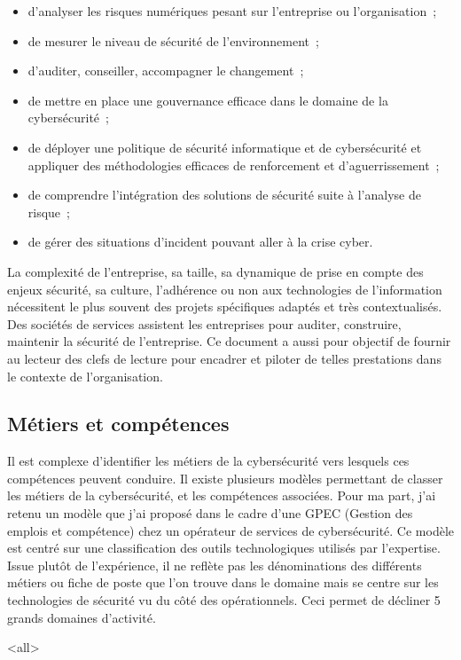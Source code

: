 \begin{itemize}
	\item d'analyser les risques numériques pesant sur l'entreprise ou l'organisation ;
	\item de mesurer le niveau de sécurité de l'environnement ;
	\item d'auditer, conseiller, accompagner le changement ;
	\item de mettre en place une gouvernance efficace dans le domaine de la cybersécurité ;
	\item de déployer une politique de sécurité informatique et de cybersécurité et appliquer des méthodologies efficaces de renforcement et d'aguerrissement ;
	\item de comprendre l'intégration des solutions de sécurité suite à l'analyse de risque ;
	\item de gérer des situations d'incident pouvant aller à la crise cyber.
\end{itemize}
La complexité de l'entreprise, sa taille, sa dynamique de prise en compte des enjeux sécurité, sa culture, l'adhérence ou non aux technologies de l'information nécessitent le plus souvent des projets spécifiques adaptés et très contextualisés. Des sociétés de services assistent les entreprises pour auditer, construire, maintenir la sécurité de l'entreprise. Ce document a aussi pour objectif de fournir au lecteur des clefs de lecture pour encadrer et piloter de telles prestations dans le contexte de l'organisation. 


\subsection{Métiers et compétences } 
Il est complexe d'identifier les métiers de la cybersécurité vers lesquels ces compétences peuvent conduire. Il existe plusieurs modèles permettant de classer les métiers de la cybersécurité, et les compétences associées. Pour ma part,  j'ai retenu un modèle que j'ai proposé dans le cadre d'une GPEC (Gestion des emplois et compétence) chez un opérateur de services de cybersécurité. Ce modèle est centré sur une classification des outils technologiques utilisés par l'expertise. Issue plutôt de l'expérience, il ne reflète pas les dénominations des différents métiers ou fiche de poste que l'on trouve dans le domaine mais se centre sur les technologies de sécurité vu du côté des opérationnels. Ceci permet de décliner 5 grands domaines d'activité.

\mode<all>{}



